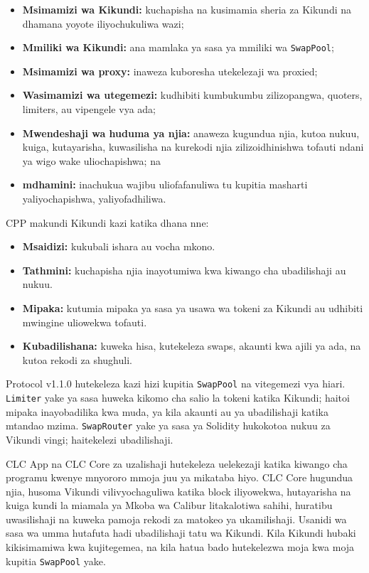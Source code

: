 \documentclass[11pt]{article}
\begin{document}
\begin{itemize}[leftmargin=*]
\item \textbf{Msimamizi wa Kikundi:} kuchapisha na kusimamia sheria za Kikundi na dhamana yoyote iliyochukuliwa wazi;
\item \textbf{Mmiliki wa Kikundi:} ana mamlaka ya sasa ya mmiliki wa \texttt{SwapPool};
\item \textbf{Msimamizi wa proxy:} inaweza kuboresha utekelezaji wa proxied;
\item \textbf{Wasimamizi wa utegemezi:} kudhibiti kumbukumbu zilizopangwa, quoters, limiters, au vipengele vya ada;
\item \textbf{Mwendeshaji wa huduma ya njia:} anaweza kugundua njia, kutoa nukuu, kuiga, kutayarisha, kuwasilisha na kurekodi njia zilizoidhinishwa tofauti ndani ya wigo wake uliochapishwa; na
\item \textbf{mdhamini:} inachukua wajibu uliofafanuliwa tu kupitia masharti yaliyochapishwa, yaliyofadhiliwa.
\end{itemize}
CPP makundi Kikundi kazi katika dhana nne:

\begin{itemize}[leftmargin=*]
\item \textbf{Msaidizi:} kukubali ishara au vocha mkono.
\item \textbf{Tathmini:} kuchapisha njia inayotumiwa kwa kiwango cha ubadilishaji au nukuu.
\item \textbf{Mipaka:} kutumia mipaka ya sasa ya usawa wa tokeni za Kikundi au udhibiti mwingine uliowekwa tofauti.
\item \textbf{Kubadilishana:} kuweka hisa, kutekeleza swaps, akaunti kwa ajili ya ada, na kutoa rekodi za shughuli.
\end{itemize}
Protocol v1.1.0 hutekeleza kazi hizi kupitia \texttt{SwapPool} na vitegemezi vya hiari. \texttt{Limiter} yake ya sasa huweka kikomo cha salio la tokeni katika Kikundi; haitoi mipaka inayobadilika kwa muda, ya kila akaunti au ya ubadilishaji katika mtandao mzima. \texttt{SwapRouter} yake ya sasa ya Solidity hukokotoa nukuu za Vikundi vingi; haitekelezi ubadilishaji.

CLC App na CLC Core za uzalishaji hutekeleza uelekezaji katika kiwango cha programu kwenye mnyororo mmoja juu ya mikataba hiyo. CLC Core hugundua njia, husoma Vikundi vilivyochaguliwa katika block iliyowekwa, hutayarisha na kuiga kundi la miamala ya Mkoba wa Calibur litakalotiwa sahihi, huratibu uwasilishaji na kuweka pamoja rekodi za matokeo ya ukamilishaji. Usanidi wa sasa wa umma hutafuta hadi ubadilishaji tatu wa Kikundi. Kila Kikundi hubaki kikisimamiwa kwa kujitegemea, na kila hatua bado hutekelezwa moja kwa moja kupitia \texttt{SwapPool} yake.
\end{document}
